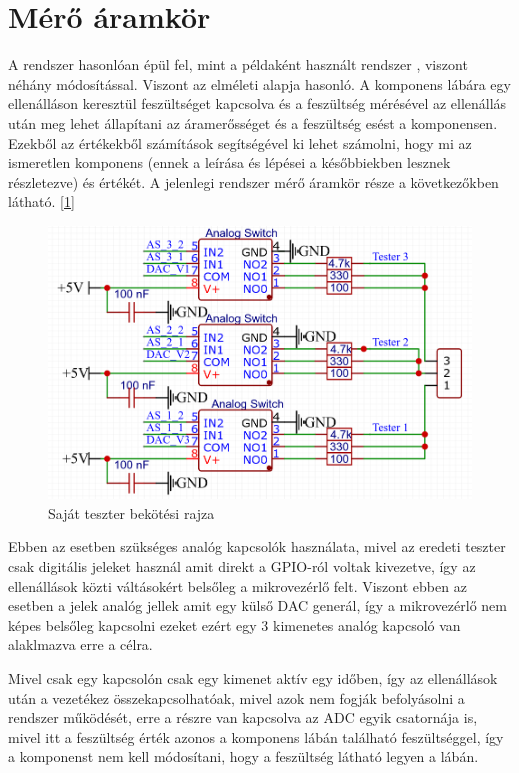 \section{Mérő áramkör}

A rendszer hasonlóan épül fel, mint a példaként használt rendszer \cite{similarSystem}, viszont néhány módosítással.
Viszont az elméleti alapja hasonló. A komponens lábára egy ellenálláson keresztül feszültséget kapcsolva és a 
feszültség mérésével az ellenállás után meg lehet állapítani az áramerősséget és a feszültség esést a komponensen.
Ezekből az értékekből számítások segítségével ki lehet számolni, hogy mi az ismeretlen komponens (ennek a leírása
és lépései a későbbiekben lesznek részletezve) és értékét. A jelenlegi rendszer mérő áramkör része a következőkben
látható. [\ref{fig:ownTesterConnection}]

\begin{figure}[h]
    \centering
    \includegraphics[scale=0.3]{figures/images/literature/TeszterConnections.png}
    \caption{Saját teszter bekötési rajza}
    \label{fig:ownTesterConnection}
\end{figure}

Ebben az esetben szükséges analóg kapcsolók használata, mivel az eredeti
teszter csak digitális jeleket használ amit direkt a GPIO-ról voltak kivezetve,
így az ellenállások közti váltásokért belsőleg a mikrovezérlő felt. Viszont ebben
az esetben a jelek analóg jellek amit egy külső DAC generál, így a mikrovezérlő nem
képes belsőleg kapcsolni ezeket ezért egy 3 kimenetes analóg kapcsoló van alaklmazva
erre a célra.

Mivel csak egy kapcsolón csak egy kimenet aktív egy időben, így az ellenállások után
a vezetékez összekapcsolhatóak, mivel azok nem fogják befolyásolni a rendszer működését,
erre a részre van kapcsolva az ADC egyik csatornája is, mivel itt a feszültség érték
azonos a komponens lábán található feszültséggel, így a komponenst nem kell módosítani,
hogy a feszültség látható legyen a lábán.

